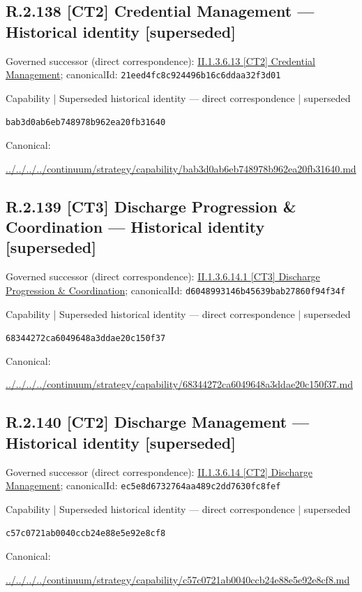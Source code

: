 \documentclass[10pt,a4paper]{article}
\begin{document}
\subsection*{R.2.138 [CT2] Credential Management — Historical identity [superseded]}
Governed successor (direct correspondence): \hyperref[element-21eed4fc8c924496b16c6ddaa32f3d01]{II.1.3.6.13 [CT2] Credential Management}; canonicalId: \texttt{21eed4fc8c924496b16c6ddaa32f3d01}\par
\label{element-bab3d0ab6eb748978b962ea20fb31640}
{\small Capability | Superseded historical identity — direct correspondence | superseded}\par
\texttt{bab3d0ab6eb748978b962ea20fb31640}\par
Canonical: \par
{\footnotesize\url{../../../../continuum/strategy/capability/bab3d0ab6eb748978b962ea20fb31640.md}}\par
\subsection*{R.2.139 [CT3] Discharge Progression \& Coordination — Historical identity [superseded]}
Governed successor (direct correspondence): \hyperref[element-d6048993146b45639bab27860f94f34f]{II.1.3.6.14.1 [CT3] Discharge Progression \& Coordination}; canonicalId: \texttt{d6048993146b45639bab27860f94f34f}\par
\label{element-68344272ca6049648a3ddae20c150f37}
{\small Capability | Superseded historical identity — direct correspondence | superseded}\par
\texttt{68344272ca6049648a3ddae20c150f37}\par
Canonical: \par
{\footnotesize\url{../../../../continuum/strategy/capability/68344272ca6049648a3ddae20c150f37.md}}\par
\subsection*{R.2.140 [CT2] Discharge Management — Historical identity [superseded]}
Governed successor (direct correspondence): \hyperref[element-ec5e8d6732764aa489c2dd7630fc8fef]{II.1.3.6.14 [CT2] Discharge Management}; canonicalId: \texttt{ec5e8d6732764aa489c2dd7630fc8fef}\par
\label{element-c57c0721ab0040ccb24e88e5e92e8cf8}
{\small Capability | Superseded historical identity — direct correspondence | superseded}\par
\texttt{c57c0721ab0040ccb24e88e5e92e8cf8}\par
Canonical: \par
{\footnotesize\url{../../../../continuum/strategy/capability/c57c0721ab0040ccb24e88e5e92e8cf8.md}}\par
\end{document}
